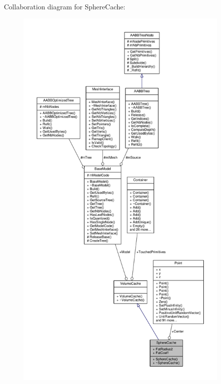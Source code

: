 Collaboration diagram for Sphere\+Cache\+:
\nopagebreak
\begin{figure}[H]
\begin{center}
\leavevmode
\includegraphics[height=550pt]{d5/d34/structSphereCache__coll__graph}
\end{center}
\end{figure}
